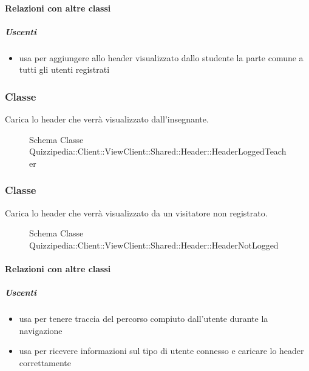 \paragraph{Relazioni con altre classi}
\subparagraph{Uscenti}
\begin{itemize}
\item usa  per aggiungere allo header visualizzato dallo studente la parte comune a tutti gli utenti registrati
\end{itemize}
\subsubsection{Classe }
Carica lo header che verrà visualizzato dall'insegnante.
\begin{figure}[H]
\centering
\noindent{}
\caption[Schema Classe HeaderLoggedTeacher]{Schema Classe Quizzipedia::Client::ViewClient::Shared::Header::HeaderLoggedTeacher}
\end{figure}
\subsubsection{Classe }
Carica lo header che verrà visualizzato da un visitatore non registrato.
\begin{figure}[H]
\centering
\noindent{}
\caption[Schema Classe HeaderNotLogged]{Schema Classe Quizzipedia::Client::ViewClient::Shared::Header::HeaderNotLogged}
\end{figure}
\paragraph{Relazioni con altre classi}
\subparagraph{Uscenti}
\begin{itemize}
\item usa  per tenere traccia del percorso compiuto dall'utente durante la navigazione
\item usa  per ricevere informazioni sul tipo di utente connesso e caricare lo header correttamente
\end{itemize}
